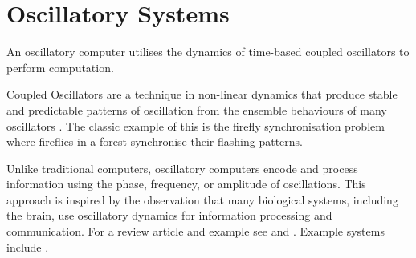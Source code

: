 \documentclass{article}
\begin{document}
% 
% 
% 
% 

\section{Oscillatory Systems}\label{oscil}

An oscillatory computer utilises the dynamics of time-based coupled oscillators to perform computation.

Coupled Oscillators are a technique in non-linear dynamics that produce stable and predictable patterns of oscillation from the ensemble behaviours of many oscillators \cite{strogatz2001nonlinear}. The classic example of this is the firefly synchronisation problem \cite{buck1988synchronous} where fireflies in a forest synchronise their flashing patterns.

Unlike traditional computers, oscillatory computers encode and process information using the phase, frequency, or amplitude of oscillations. This approach is inspired by the observation that many biological systems, including the brain, use oscillatory dynamics for information processing and communication. For a review article and example see \cite{csaba2020coupled} and \cite{csaba2018perspectives}. Example systems include \cite{ring} \cite{delacour2021oscillatory} \cite{delacour2023mixed} \cite{corti2021networks} \cite{frady2019robust} \cite{maher2024highly}.
\end{document}
